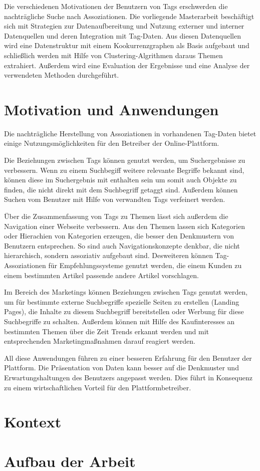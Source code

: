 Die verschiedenen Motivationen der Benutzern von Tags erschwerden die nachträgliche Suche nach Assoziationen. Die vorliegende Masterarbeit beschäftigt sich mit Strategien zur Datenaufbereitung und Nutzung externer und interner Datenquellen und deren Integration mit Tag-Daten. Aus diesen Datenquellen wird eine Datenstruktur mit einem Kookurrenzgraphen als Basis aufgebaut und schließlich werden mit Hilfe von Clustering-Algrithmen daraus Themen extrahiert. Außerdem wird eine Evaluation der Ergebnisse und eine Analyse der verwendeten Methoden durchgeführt.

\section{Motivation und Anwendungen}

Die nachträgliche Herstellung von Assoziationen in vorhandenen Tag-Daten bietet einige Nutzungsmöglichkeiten für den Betreiber der Online-Plattform.

Die Beziehungen zwischen Tags können genutzt werden, um Suchergebnisse zu verbessern. Wenn zu einem Suchbegiff weitere relevante Begriffe bekannt sind, können diese im Suchergebnis mit enthalten sein um somit auch Objekte zu finden, die nicht direkt mit dem Suchbegriff getaggt sind. Außerdem können Suchen vom Benutzer mit Hilfe von verwandten Tags verfeinert werden.

Über die Zusammenfassung von Tags zu Themen lässt sich außerdem die Navigation einer Webseite verbessern. Aus den Themen lassen sich Kategorien oder Hierachien von Kategorien erzeugen, die besser den Denkmustern von Benutzern entsprechen. So sind auch Navigationskonzepte denkbar, die nicht hierarchisch, sondern assoziativ aufgebaut sind. Desweiteren können Tag-Assoziationen für Empfehlungssysteme genutzt werden, die einem Kunden zu einem bestimmten Artikel passende andere Artikel vorschlagen.

Im Bereich des Marketings können Beziehungen zwischen Tags genutzt werden, um für bestimmte externe Suchbegriffe spezielle Seiten zu erstellen (Landing Pages), die Inhalte zu diesem Suchbegriff bereitstellen oder Werbung für diese Suchbegriffe zu schalten. Außerdem können mit Hilfe des Kaufinteresses an bestimmten Themen über die Zeit Trends erkannt werden und mit entsprechenden Marketingmaßnahmen darauf reagiert werden.

All diese Anwendungen führen zu einer besseren Erfahrung für den Benutzer der Plattform. Die Präsentation von Daten kann besser auf die Denkmuster und Erwartungshaltungen des Benutzers angepasst werden. Dies führt in Konsequenz zu einem wirtschaftlichen Vorteil für den Plattformbetreiber.

\section{Kontext}

\section{Aufbau der Arbeit}